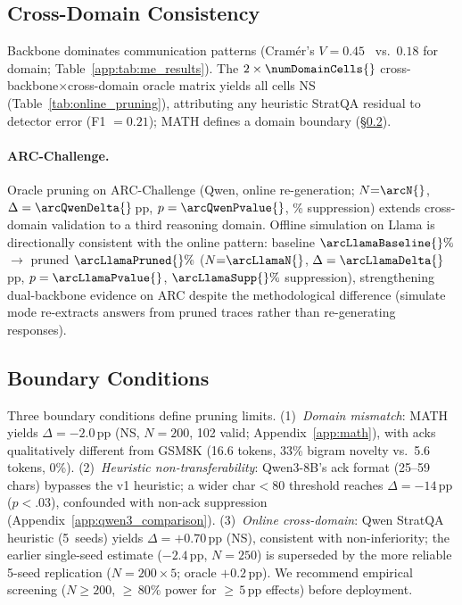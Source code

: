 \subsection{Cross-Domain Consistency}
\label{sec:cross_domain}

Backbone dominates communication patterns (Cram\'{e}r's $V = 0.45$~\cite{cramer_1946} vs.\ $0.18$ for domain; Table~\ref{app:tab:me_results}). The $2 \times \numDomainCells{}$ cross-backbone$\times$cross-domain oracle matrix yields all cells NS (Table~\ref{tab:online_pruning}), attributing any heuristic StratQA residual to detector error (F1 $= 0.21$); MATH defines a domain boundary (\S\ref{sec:boundary}).

\paragraph{ARC-Challenge.} Oracle pruning on ARC-Challenge (Qwen, online re-generation; $N{=}\arcN{}$, $\Delta = \arcQwenDelta{}$\,pp, $p = \arcQwenPvalue{}$, \arcQwenSupp{}\% suppression) extends cross-domain validation to a third reasoning domain. Offline simulation on Llama is directionally consistent with the online pattern: baseline $\arcLlamaBaseline{}\%$ $\to$ pruned $\arcLlamaPruned{}\%$ ($N{=}\arcLlamaN{}$, $\Delta = \arcLlamaDelta{}$\,pp, $p = \arcLlamaPvalue{}$, $\arcLlamaSupp{}\%$ suppression), strengthening dual-backbone evidence on ARC despite the methodological difference (simulate mode re-extracts answers from pruned traces rather than re-generating responses).

\subsection{Boundary Conditions}
\label{sec:boundary}

Three boundary conditions define pruning limits. (1)~\emph{Domain mismatch}: MATH yields $\Delta = -2.0$\,pp (NS, $N{=}200$, 102 valid; Appendix~\ref{app:math}), with acks qualitatively different from GSM8K (16.6 tokens, 33\% bigram novelty vs.\ 5.6 tokens, 0\%). (2)~\emph{Heuristic non-transferability}: Qwen3-8B's ack format (25--59 chars) bypasses the v1 heuristic; a wider char$<$80 threshold reaches $\Delta = -14$\,pp ($p < .03$), confounded with non-ack suppression (Appendix~\ref{app:qwen3_comparison}). (3)~\emph{Online cross-domain}: Qwen StratQA heuristic (5~seeds) yields $\Delta = +0.70$\,pp (NS), consistent with non-inferiority; the earlier single-seed estimate ($-2.4$\,pp, $N{=}250$) is superseded by the more reliable 5-seed replication ($N{=}200 \times 5$; oracle $+0.2$\,pp). We recommend empirical screening ($N \geq 200$, ${\geq}\,80\%$ power for ${\geq}\,5$\,pp effects) before deployment.
